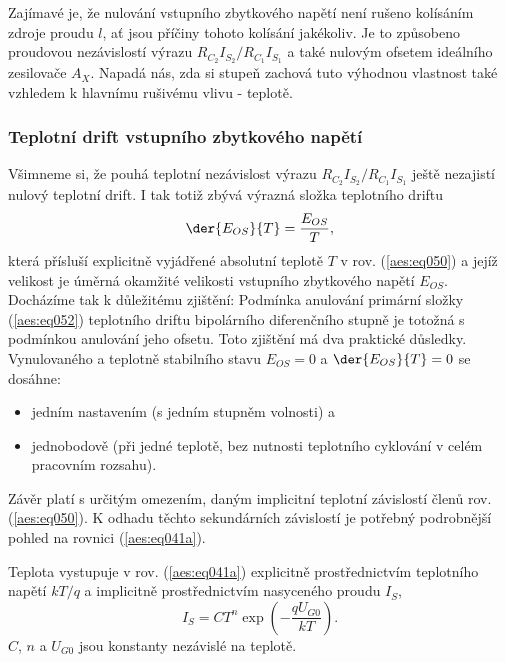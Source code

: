         Zajímavé je, že nulování vstupního zbytkového napětí není rušeno kolísáním zdroje proudu
        \(l\), ať jsou příčiny tohoto kolísání jakékoliv. Je to způsobeno proudovou nezávislostí
        výrazu \(R_{C_2}I_{S_2}/R_{C_1}I_{S_1}\) a také nulovým ofsetem ideálního zesilovače
        \(A_X\). Napadá nás, zda si stupeň zachová tuto výhodnou vlastnost také vzhledem k hlavnímu
        rušivému vlivu - teplotě.
 
      \subsubsection{Teplotní drift vstupního zbytkového napětí}\label{aesIchIIIsecIIIssecVII}
        Všimneme si, že pouhá teplotní nezávislost výrazu \(R_{C_2}I_{S_2}/R_{C_1}I_{S_1}\) ještě
        nezajistí nulový teplotní drift. I tak totiž zbývá výrazná složka teplotního driftu
        \begin{equation}\label{aes:eq052} 
          \der{E_{OS}}{T} = \dfrac{E_{OS}}{T},
        \end{equation}
        která přísluší explicitně vyjádřené absolutní teplotě  \(T\) v rov. (\ref{aes:eq050}) a
        jejíž velikost je úměrná okamžité velikosti vstupního zbytkového napětí \(E_{OS}\).
        Docházíme tak k důležitému zjištění: Podmínka anulování primární složky (\ref{aes:eq052})
        teplotního driftu bipolárního diferenčního stupně je totožná s podmínkou anulování jeho
        ofsetu. Toto zjištění má dva praktické důsledky. Vynulovaného a teplotně stabilního stavu
        \(E_{OS} = 0\) a \(\der{ E_{OS}}{T} = 0\) se dosáhne:
        \begin{itemize}[noitemsep]
          \item jedním nastavením (s jedním stupněm volnosti) a
          \item jednobodově (při jedné teplotě, bez nutnosti teplotního cyklování v celém pracovním
                rozsahu).                  
        \end{itemize}

        Závěr platí s určitým omezením, daným implicitní teplotní závislostí členů rov.
        (\ref{aes:eq050}). K odhadu těchto sekundárních závislostí je potřebný podrobnější pohled na
        rovnici (\ref{aes:eq041a}).

        Teplota vystupuje v rov. (\ref{aes:eq041a}) explicitně prostřednictvím teplotního napětí
        \(kT/q\) a implicitně prostřednictvím nasyceného proudu \(I_S\),
        \begin{equation}\label{aes:eq053}
          I_S = CT^n\exp\left(-\dfrac{qU_{G0}}{kT}\right).
        \end{equation}
        \(C\), \(n\) a \(U_{G0}\) jsou konstanty nezávislé na teplotě.

